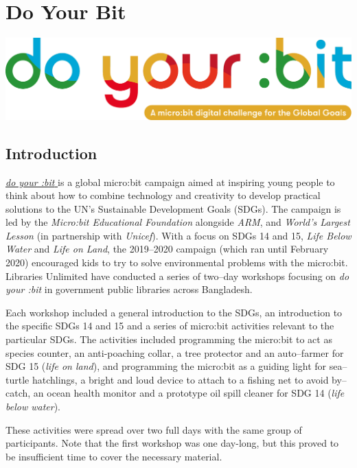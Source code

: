 \documentclass[12pt]{report} %
\newcommand{\DYB}{\textit{do your :bit }}
\begin{document}
\chapter{Do Your Bit}\label{chapter:DYB}
\graphicspath{{doyourbit/}{images/}} %

\includegraphics[width=0.7\linewidth, left]{DYBlogo} %

\section{Introduction} %

\href{https://microbit.org/do-your-bit/}{\DYB} is a global micro:bit campaign aimed at inspiring young people to think about how to combine technology and creativity to develop practical solutions to the UN's Sustainable Development Goals (SDGs). The campaign is led by the \textit{Micro:bit Educational Foundation} alongside \textit{ARM}, and \textit{World's Largest Lesson} (in partnership with \textit{Unicef}). With a focus on SDGs 14 and 15, \textit{Life Below Water} and \textit{Life on Land}, the 2019--2020 campaign (which ran until February 2020) encouraged kids to try to solve environmental problems with the micro:bit. Libraries Unlimited have conducted a series of two--day workshops focusing on \DYB in government public libraries across Bangladesh. 

Each workshop included a general introduction to the SDGs, an introduction to the specific SDGs 14 and 15 and a series of micro:bit activities relevant to the particular SDGs. The activities included programming the micro:bit to act as species counter, an anti-poaching collar, a tree protector and an auto--farmer for SDG 15 (\textit{life on land}), and programming the micro:bit as a guiding light for sea--turtle hatchlings, a bright and loud device to attach to a fishing net to avoid by--catch, an ocean health monitor and a prototype oil spill cleaner for SDG 14 (\textit{life below water}). 

These activities were spread over two full days with the same group of participants. Note that the first workshop was one day-long, but this proved to be insufficient time to cover the necessary material. 
\end{document}
